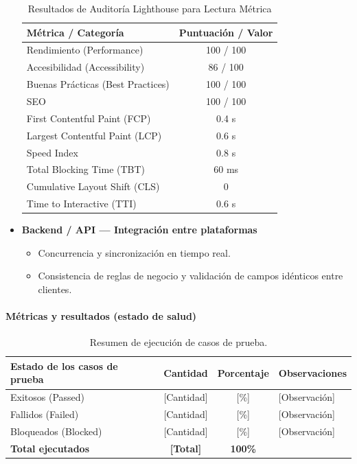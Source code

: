 \documentclass[12pt, atypical, journal]{article}
\begin{document}
\begin{itemize}
\begin{table}[h!]
    \centering
    \caption{Resultados de Auditoría Lighthouse para Lectura Métrica}
    \begin{tabular}{|l|c|}
        \hline
        \textbf{Métrica / Categoría} & \textbf{Puntuación / Valor} \\ \hline
        Rendimiento (Performance) & 100 / 100 \\ \hline
        Accesibilidad (Accessibility) & 86 / 100 \\ \hline
        Buenas Prácticas (Best Practices) & 100 / 100 \\ \hline
        SEO & 100 / 100 \\ \hline
        First Contentful Paint (FCP) & 0.4 s \\ \hline
        Largest Contentful Paint (LCP) & 0.6 s \\ \hline
        Speed Index & 0.8 s \\ \hline
        Total Blocking Time (TBT) & 60 ms \\ \hline
        Cumulative Layout Shift (CLS) & 0 \\ \hline
        Time to Interactive (TTI) & 0.6 s \\ \hline
    \end{tabular}
    \label{tab:lighthouse-metrics}
\end{table}
    \item \textbf{Backend / API — Integración entre plataformas}
    \begin{itemize}
        \item Concurrencia y sincronización en tiempo real.
        \item Consistencia de reglas de negocio y validación de campos idénticos entre clientes.
    \end{itemize}
\end{itemize}

\paragraph{Métricas y resultados (estado de salud)}
\begin{table}[H]
\centering
\small
\begin{tabular}{|l|c|c|p{4.5cm}|}
\hline
\textbf{Estado de los casos de prueba} & \textbf{Cantidad} & \textbf{Porcentaje} & \textbf{Observaciones} \\ \hline
Exitosos (Passed) & [Cantidad] & [\%] & [Observación] \\ \hline
Fallidos (Failed) & [Cantidad] & [\%] & [Observación] \\ \hline
Bloqueados (Blocked) & [Cantidad] & [\%] & [Observación] \\ \hline
\textbf{Total ejecutados} & \textbf{[Total]} & \textbf{100\%} & \\ \hline
\end{tabular}
\caption{Resumen de ejecución de casos de prueba.}
\label{tab:qa_resultados}
\end{table}
\end{document}
